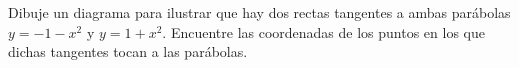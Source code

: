 \item Dibuje un diagrama para ilustrar que hay dos rectas tangentes a ambas parábolas $y = -1 - x^2$ y $y = 1 + x^2$. Encuentre las coordenadas de los puntos en los que dichas tangentes tocan a las parábolas.
